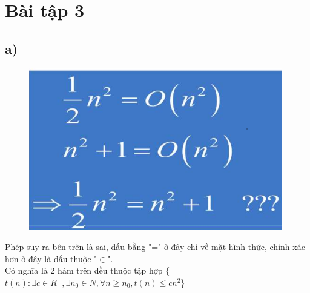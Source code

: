 \documentclass[10pt,a4paper]{article}
\begin{document}
\section*{Bài tập 3} 
\subsection*{a)}
\begin{figure}[H]
    \centering
    \includegraphics[scale=0.8]{images/3a.png}
\end{figure}
Phép suy ra bên trên là sai, dấu bằng "=" ở đây chỉ về mặt hình thức, chính xác hơn ở đây là dấu thuộc "$\in$".\\
Có nghĩa là 2 hàm trên đều thuộc tập hợp \{$t(n):  \exists c \in R^+,\exists n_0\in N,\forall n \geq n_0,t(n)\leq cn^2$\}\\
\end{document}
